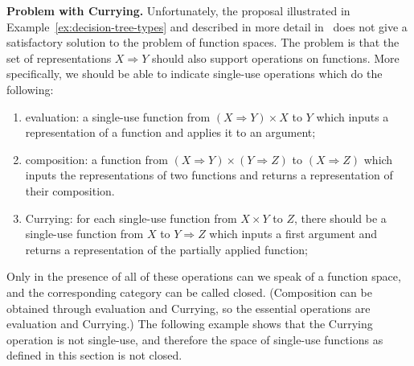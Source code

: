 \textbf{Problem with Currying.}
Unfortunately, the proposal illustrated in Example~\ref{ex:decision-tree-types} and described in more detail in~\cite{stefanski-phd}  does not give a satisfactory solution to the problem of function spaces. The problem is that the set of representations $X \Rightarrow Y$ should  also support operations on functions. More specifically, we should be able to indicate single-use operations which do the following:
\begin{enumerate}
    \item evaluation: a single-use function from $(X \Rightarrow Y) \times X$ to $Y$ which inputs a representation of a function and applies it to an argument;
    \item composition: a function from $(X \Rightarrow Y) \times (Y \Rightarrow Z)$ to $(X \Rightarrow Z)$ which inputs the representations of two functions and returns a representation of their composition.
    \item Currying: for each single-use function from  $ X \times Y $ to $Z$, there should be a single-use function from $X$ to $Y \Rightarrow Z$ which inputs a first argument and returns a representation of the  partially applied function;
\end{enumerate}
Only in the presence of all of these operations can we speak of a function space, and the corresponding category can be called closed. (Composition can be obtained through evaluation and Currying, so the essential operations are evaluation and Currying.) The following example shows that the Currying operation is not single-use, and therefore the space of single-use functions as defined in this section is not closed. 


